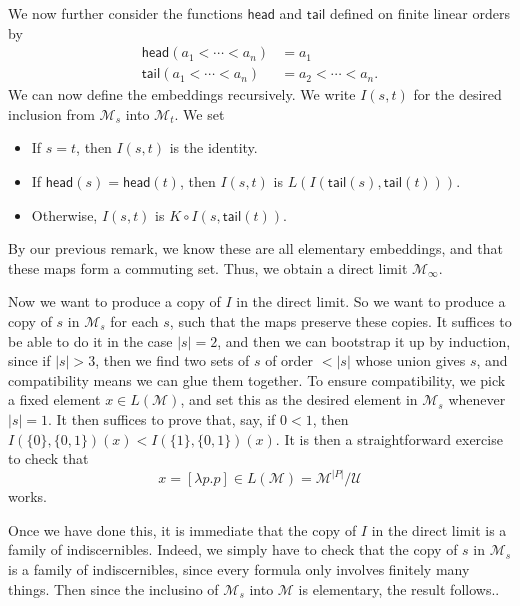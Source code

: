 \documentclass[a4paper]{article}
\newcommand\last{\mathsf{last}}
\newcommand\butlast{\mathsf{butlast}}
\newcommand\head{\mathsf{head}}
\newcommand\tail{\mathsf{tail}}
\begin{document}
We now further consider the functions $\head$ and $\tail$ defined on finite linear orders by
\begin{align*}
  \head(a_1 < \cdots < a_n) &= a_1\\
  \tail(a_1 < \cdots < a_n) &= a_2 < \cdots < a_n.
\end{align*}
We can now define the embeddings recursively. We write $I(s, t)$ for the desired inclusion from $\mathcal{M}_s$ into $\mathcal{M}_t$. We set
\begin{itemize}
  \item If $s = t$, then $I(s, t)$ is the identity.
  \item If $\head(s) = \head(t)$, then $I(s, t)$ is $L(I(\tail(s), \tail(t)))$.
  \item Otherwise, $I(s, t)$ is $K \circ I(s, \tail(t))$.
\end{itemize}
By our previous remark, we know these are all elementary embeddings, and that these maps form a commuting set. Thus, we obtain a direct limit $\mathcal{M}_\infty$.

Now we want to produce a copy of $I$ in the direct limit. So we want to produce a copy of $s$ in $\mathcal{M}_s$ for each $s$, such that the maps preserve these copies. It suffices to be able to do it in the case $|s| = 2$, and then we can bootstrap it up by induction, since if $|s| > 3$, then we find two sets of $s$ of order $< |s|$ whose union gives $s$, and compatibility means we can glue them together. To ensure compatibility, we pick a fixed element $x \in L(\mathcal{M})$, and set this as the desired element in $\mathcal{M}_s$ whenever $|s| = 1$. It then suffices to prove that, say, if $0 < 1$, then $I(\{0\}, \{0, 1\})(x) < I(\{1\}, \{0, 1\})(x)$. It is then a straightforward exercise to check that
\[
  x = [\lambda p. p] \in L(\mathcal{M}) = \mathcal{M}^{|P|}/\mathcal{U}
\]
works.

Once we have done this, it is immediate that the copy of $I$ in the direct limit is a family of indiscernibles. Indeed, we simply have to check that the copy of $s$ in $\mathcal{M}_s$ is a family of indiscernibles, since every formula only involves finitely many things. Then since the inclusino of $\mathcal{M}_s$ into $\mathcal{M}$ is elementary, the result follows..
\end{document}
